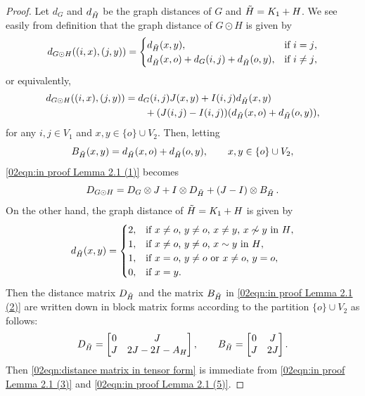 \documentclass[12pt,a4paper]{article}
\newcommand{\1}{{\bm 1}}
\numberwithin{equation}{section}
\begin{document}
\begin{proof}
Let $d_G$ and $d_{\Tilde{H}}$ be the graph distances of
$G$ and $\Tilde{H}=K_1+H$.
We see easily from definition that
the graph distance of $G\odot H$ is given by
\[
d_{G\odot H}((i,x),(j,y))=
\begin{cases}
d_{\Tilde{H}}(x,y), & \text{if $i=j$}, \\
d_{\Tilde{H}}(x,o)+d_G(i,j)+d_{\Tilde{H}}(o,y), & \text{if $i\neq j$},
\end{cases}
\]
or equivalently,
\begin{align}
d_{G\odot H}((i,x),(j,y))
&=d_G(i,j)J(x,y)+I(i,j)d_{\Tilde{H}}(x,y) 
\nonumber \\
&\qquad  +(J(i,j)-I(i,j))(d_{\Tilde{H}}(x,o)+d_{\Tilde{H}}(o,y)), 
\label{02eqn:in proof Lemma 2.1 (1)}
\end{align}
for any $i,j \in V_1$ and $x,y\in \{o\}\cup V_2$.
Then, letting
%
\begin{equation}\label{02eqn:in proof Lemma 2.1 (2)}
B_{\Tilde{H}}(x,y)=d_{\Tilde{H}}(x,o)+d_{\Tilde{H}}(o,y),
\qquad x,y\in \{o\}\cup V_2,
\end{equation}
%
\eqref{02eqn:in proof Lemma 2.1 (1)} becomes
%
\begin{equation}\label{02eqn:in proof Lemma 2.1 (3)}
D_{G\odot H}
=D_G\otimes J +I \otimes D_{\Tilde{H}}
+(J-I)\otimes B_{\Tilde{H}}\,.
\end{equation}
%
On the other hand, the graph distance of $\Tilde{H}=K_1+H$ is given by
%
\begin{equation}\label{02eqn:in proof Lemma 2.1 (4)}
d_{\Tilde{H}}(x,y)=
\begin{cases}
2, & \text{if $x\neq o$, $y\neq o$, $x\neq y$, $x\not\sim y$ in $H$}, \\
1, & \text{if $x\neq o$, $y\neq o$, $x\sim y$ in $H$}, \\
1, & \text{if $x=o$, $y\neq o$ or $x\neq o$, $y=o$}, \\
0, &\text {if $x=y$}.
\end{cases}
\end{equation}
%
Then the distance matrix $D_{\Tilde{H}}$
and the matrix $B_{\Tilde{H}}$ in \eqref{02eqn:in proof Lemma 2.1 (2)}
are written down in block matrix forms according to
the partition $\{o\}\cup V_2$ as follows:
%
\begin{equation}\label{02eqn:in proof Lemma 2.1 (5)}
D_{\Tilde{H}}
=\begin{bmatrix}
0 & J \\
J & 2J-2I-A_H
\end{bmatrix},
\qquad
B_{\Tilde{H}}=
\begin{bmatrix}
0 & J \\
J & 2J
\end{bmatrix}.
\end{equation}
Then \eqref{02eqn:distance matrix in tensor form} is
immediate from \eqref{02eqn:in proof Lemma 2.1 (3)}
and \eqref{02eqn:in proof Lemma 2.1 (5)}.
\end{proof}
\end{document}
